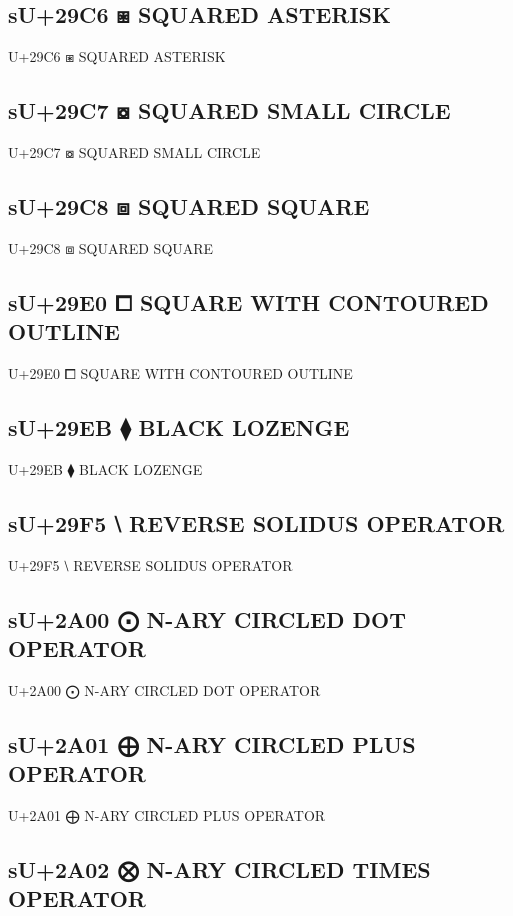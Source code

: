 \subsection{sU+29C6 ⧆ SQUARED ASTERISK}

U+29C6 ⧆ SQUARED ASTERISK

\subsection{sU+29C7 ⧇ SQUARED SMALL CIRCLE}

U+29C7 ⧇ SQUARED SMALL CIRCLE

\subsection{sU+29C8 ⧈ SQUARED SQUARE}

U+29C8 ⧈ SQUARED SQUARE

\subsection{sU+29E0 ⧠ SQUARE WITH CONTOURED OUTLINE}

U+29E0 ⧠ SQUARE WITH CONTOURED OUTLINE

\subsection{sU+29EB ⧫ BLACK LOZENGE}

U+29EB ⧫ BLACK LOZENGE

\subsection{sU+29F5 ⧵ REVERSE SOLIDUS OPERATOR}

U+29F5 ⧵ REVERSE SOLIDUS OPERATOR

\subsection{sU+2A00 ⨀ N-ARY CIRCLED DOT OPERATOR}

U+2A00 ⨀ N-ARY CIRCLED DOT OPERATOR

\subsection{sU+2A01 ⨁ N-ARY CIRCLED PLUS OPERATOR}

U+2A01 ⨁ N-ARY CIRCLED PLUS OPERATOR

\subsection{sU+2A02 ⨂ N-ARY CIRCLED TIMES OPERATOR}

